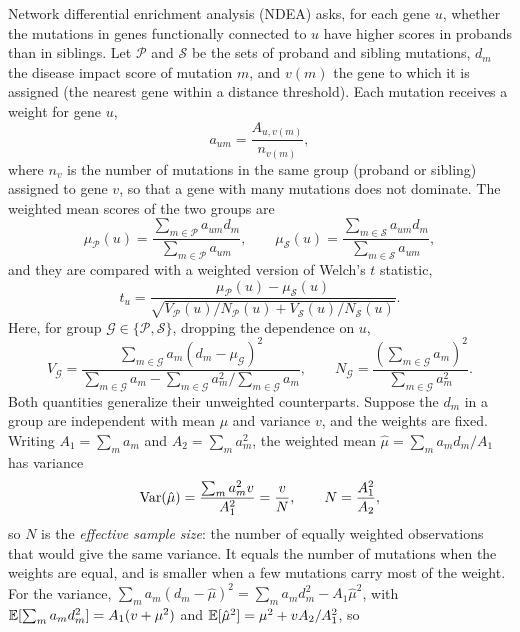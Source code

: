 Network differential enrichment analysis (NDEA) asks, for each gene $u$, whether the mutations in genes functionally connected to $u$ have higher scores in probands than in siblings. Let $\mathcal{P}$ and $\mathcal{S}$ be the sets of proband and sibling mutations, $d_m$ the disease impact score of mutation $m$, and $v(m)$ the gene to which it is assigned (the nearest gene within a distance threshold). Each mutation receives a weight for gene $u$,
\begin{equation}
  a_{um} = \frac{A_{u,v(m)}}{n_{v(m)}} ,
\end{equation}
where $n_{v}$ is the number of mutations in the same group (proband or sibling) assigned to gene $v$, so that a gene with many mutations does not dominate. The weighted mean scores of the two groups are
\begin{equation}
  \mu_{\mathcal{P}}(u) = \frac{\sum_{m\in\mathcal{P}}a_{um}d_m}{\sum_{m\in\mathcal{P}}a_{um}}, \qquad
  \mu_{\mathcal{S}}(u) = \frac{\sum_{m\in\mathcal{S}}a_{um}d_m}{\sum_{m\in\mathcal{S}}a_{um}} ,
\end{equation}
and they are compared with a weighted version of Welch's $t$ statistic,
\begin{equation}
  t_u = \frac{\mu_{\mathcal{P}}(u)-\mu_{\mathcal{S}}(u)}{\sqrt{V_{\mathcal{P}}(u)/N_{\mathcal{P}}(u)+V_{\mathcal{S}}(u)/N_{\mathcal{S}}(u)}} .
  \label{eq:ndea}
\end{equation}
Here, for group $\mathcal{G}\in\{\mathcal{P},\mathcal{S}\}$, dropping the dependence on $u$,
\begin{equation}
  V_{\mathcal{G}} = \frac{\sum_{m\in\mathcal{G}}a_{m}(d_m-\mu_{\mathcal{G}})^2}{\sum_{m\in\mathcal{G}}a_m-\sum_{m\in\mathcal{G}}a_m^2\big/\sum_{m\in\mathcal{G}}a_m}, \qquad
  N_{\mathcal{G}} = \frac{\left(\sum_{m\in\mathcal{G}}a_m\right)^2}{\sum_{m\in\mathcal{G}}a_m^2} .
\end{equation}
Both quantities generalize their unweighted counterparts. Suppose the $d_m$ in a group are independent with mean $\mu$ and variance $v$, and the weights are fixed. Writing $A_1=\sum_m a_m$ and $A_2=\sum_m a_m^2$, the weighted mean $\hat\mu=\sum_m a_md_m/A_1$ has variance
\begin{equation}
  \operatorname{Var}(\hat\mu) = \frac{\sum_m a_m^2 v}{A_1^2} = \frac{v}{N}, \qquad N=\frac{A_1^2}{A_2},
\end{equation}
so $N$ is the \emph{effective sample size}: the number of equally weighted observations that would give the same variance. It equals the number of mutations when the weights are equal, and is smaller when a few mutations carry most of the weight. For the variance, $\sum_ma_m(d_m-\hat\mu)^2=\sum_ma_md_m^2-A_1\hat\mu^2$, with $\mathbb{E}[\sum_ma_md_m^2]=A_1(v+\mu^2)$ and $\mathbb{E}[\hat\mu^2]=\mu^2+vA_2/A_1^2$, so
